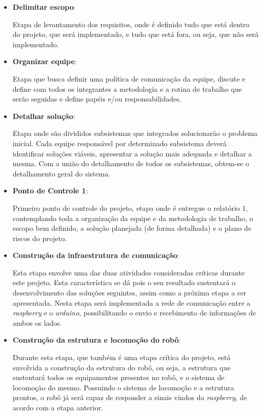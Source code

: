 	\begin{itemize}
		\item \textbf{Delimitar escopo}:

			Etapa de levantamento dos requisitos, onde é definido tudo que está dentro do projeto, que será implementado, e tudo que está fora, ou seja, que não será implementado.

		\item \textbf{Organizar equipe}:

			Etapa que busca definir uma política de comunicação da equipe, discute e define com todos os integrantes a metodologia e a rotina de trabalho que serão seguidas e define papéis e/ou responsabilidades.

		\item \textbf{Detalhar solução}:

			Etapa onde são divididos subsistemas que integrados solucionarão o problema inicial. Cada equipe responsável por determinado subsistema deverá identificar soluções viáveis, apresentar a solução mais adequada e detalhar a mesma. Com a união do detalhamento de todos os subsistemas, obtem-se o detalhamento geral do sistema.

		\item \textbf{Ponto de Controle 1}:

			Primeiro ponto de controle do projeto, etapa onde é entregue o relatório 1, contemplando toda a organização da equipe e da metodologia de trabalho, o escopo bem definido, a solução planejada (de forma detalhada) e o plano de riscos do projeto.

		\item \textbf{Construção da infraestrutura de comunicação}:

			Esta etapa envolve uma das duas atividades consideradas críticas durante este projeto. Esta característica se dá pois o seu resultado sustentará o desenvolvimento das soluções seguintes, assim como a próxima etapa a ser apresentada. Nesta etapa será implementada a rede de comunicação entre a \textit{raspberry} e o \textit{arduino}, possibilitando o envio e recebimento de informações de ambos os lados.

		\item \textbf{Construção da estrutura e locomoção do robô}:

			Durante esta etapa, que também é uma etapa crítica do projeto, está envolvida a construção da estrutura do robô, ou seja, a estrutura que sustentará todos os equipamentos presentes no robô, e o sistema de locomoção do mesmo. Possuindo o sistema de locomoção e a estrutura prontos, o robô já será capaz de responder a sinais vindos da \textit{raspberry}, de acordo com a etapa anterior.


\end{itemize}
